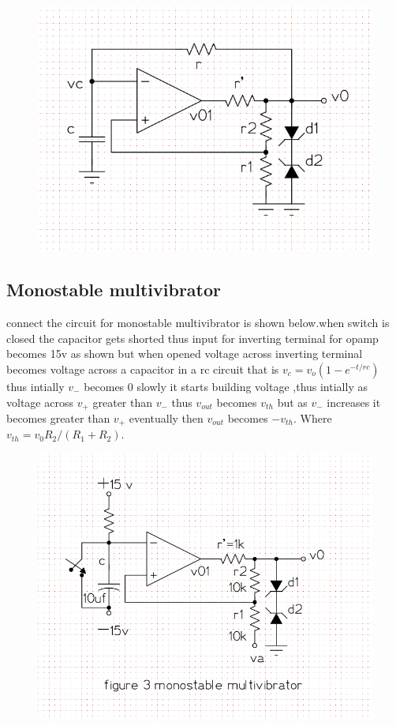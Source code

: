 \documentclass[12pt]{article}
\begin{document}
\begin{figure}[h!]
\centering
\includegraphics[scale = 0.6]{astable_multi.png}
\end{figure}
\newpage

\subsection{Monostable multivibrator}
connect the circuit for monostable multivibrator is shown below.when switch is closed the capacitor gets shorted thus input for inverting terminal for opamp becomes 15v as shown but when opened voltage across inverting terminal becomes voltage across a capacitor in a rc circuit that is \(v_{c}=v_{o}(1-e^{-t/rc})\) thus intially \(v_{-}\) becomes 0 slowly it starts building voltage ,thus intially as voltage across \(v_{+}\) greater than \(v_{-}\) thus \(v_{out}\) becomes \(v_{th}\) but as \(v_{-}\) increases it becomes greater than \(v_{+}\) eventually then \(v_{out}\) becomes \(-v_{th}\). Where \(v_{th}=v_{0}R_{2}/(R_{1}+R_{2})\).
\begin{figure}[h!]
\centering
\includegraphics[scale = 0.4]{mono_multivib.png}
\end{figure}
\newpage
\end{document}
